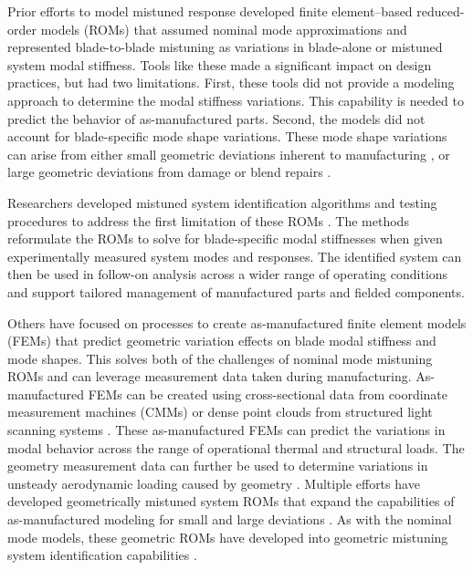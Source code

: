 \documentclass[colorlinks,upint,subscriptcorrection,varvw,hyphenate,balance,govt]{asmeconf}
\begin{document}
Prior efforts to model mistuned response developed finite element–based reduced-order models (ROMs) that assumed nominal mode approximations and represented blade-to-blade mistuning as variations in blade-alone or mistuned system modal stiffness\cite{Castanier1997, Yang1999, Feiner2002, Lim2007}. Tools like these made a significant impact on design practices, but had two limitations. First, these tools did not provide a modeling approach to determine the modal stiffness variations. This capability is needed to predict the behavior of as-manufactured parts. Second, the models did not account for blade-specific mode shape variations. These mode shape variations can arise from either small geometric deviations inherent to manufacturing \cite{Beck2013}, or large geometric deviations from damage or blend repairs \cite{Madden2012}.

Researchers developed mistuned system identification algorithms and testing procedures to address the first limitation of these ROMs \cite{Feiner2004, Judge2009, Waldherr2020, Kelly2022}. The methods reformulate the ROMs to solve for blade-specific modal stiffnesses when given experimentally measured system modes and responses. The identified system can then be used in follow-on analysis across a wider range of operating conditions and support tailored management of manufactured parts and fielded components.

Others have focused on processes to create as-manufactured finite element models (FEMs) that predict geometric variation effects on blade modal stiffness and mode shapes. This solves both of the challenges of nominal mode mistuning ROMs and can leverage measurement data taken during manufacturing. As-manufactured FEMs can be created using cross-sectional data from coordinate measurement machines (CMMs) \cite{Brown2003, Sinha2008, Bouras2024} or dense point clouds from structured light scanning systems \cite{Schoenenborn2009, Kaszynski2014, Maywald2017}. These as-manufactured FEMs can predict the variations in modal behavior across the range of operational thermal and structural loads. The geometry measurement data can further be used to determine variations in unsteady aerodynamic loading caused by geometry \cite{Clark2018}. Multiple efforts have developed geometrically mistuned system ROMs that expand the capabilities of as-manufactured modeling for small and large deviations \cite{Sinha2009, Beck2014, Baek2017, Bouras2024}. As with the nominal mode models, these geometric ROMs have developed into geometric mistuning system identification capabilities \cite{Bhartiya2014, Beck2023}.
\end{document}
